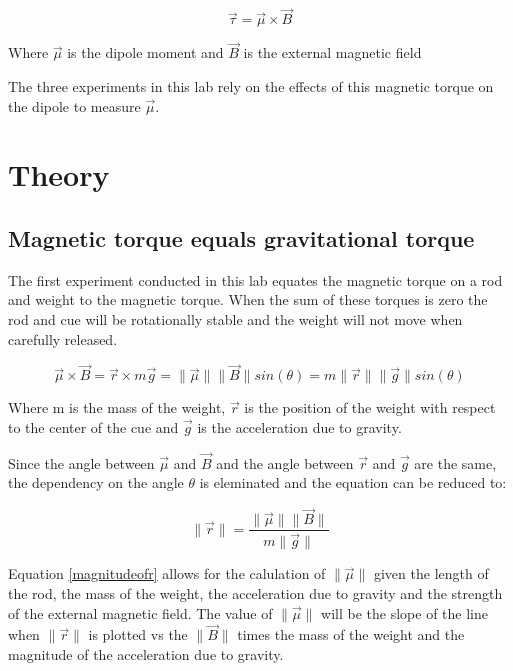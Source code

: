 \documentclass[twocolumn,secnumarabic,amssymb, nobibnotes, aps, pra]{revtex4}
\newcommand{\norm}[1]{\lVert#1\rVert}
\begin{document}
\begin{mycapequ}[!ht]
\begin{equation}
\vec{\tau} = \vec{\mu} \times \vec{B}
\label{torque}  %
\end{equation}  
\caption{Where $\vec{\mu}$ is the dipole moment and $\vec{B}$ is the external magnetic field}
\end{mycapequ}
The three experiments in this lab rely on the effects of this magnetic torque on the dipole to measure  $\vec{\mu}$.  

\section{Theory}
\subsection{Magnetic torque equals gravitational torque}
The first experiment conducted in this lab equates the magnetic torque on a rod and weight to the magnetic torque.  When the sum of these torques is zero the rod and cue will be rotationally stable and the weight will not move when carefully released.

\begin{mycapequ}[!ht]
\begin{equation}
\vec{\mu} \times \vec{B} = \vec{r} \times m\vec{g}  = \norm{\vec{\mu}} \norm{\vec{B}}sin(\theta) = m\norm{\vec{r}}\norm{\vec{g}}sin(\theta)
\label{sumoftorque}   %
\end{equation}  
\caption{Where m is the mass of the weight, $\vec{r}$ is the position of the weight with respect to the center of the cue and $\vec{g}$ is the acceleration due to gravity.}
\end{mycapequ}

Since the angle between $\vec{\mu}$ and $\vec{B}$ and the angle between $\vec{r}$ and $\vec{g}$ are the same, the dependency on the angle $\theta$ is eleminated and the equation can be reduced to:

\begin{equation}
\norm{\vec{r}} = \frac{\norm{\vec{\mu}} \norm{\vec{B}}}{m\norm{\vec{g}}}
\label{magnitudeofr}   %
\end{equation}  

Equation \ref{magnitudeofr} allows for the calulation of $\norm{\vec{\mu}}$ given the length of the rod, the mass of the weight, the acceleration due to gravity and the strength of the external magnetic field.  The value of $\norm{\vec{\mu}}$ will be the slope of the line when $\norm{\vec{r}}$ is plotted vs the $\norm{\vec{B}}$ times the mass of the weight and the magnitude of the acceleration due to gravity.
\end{document}
